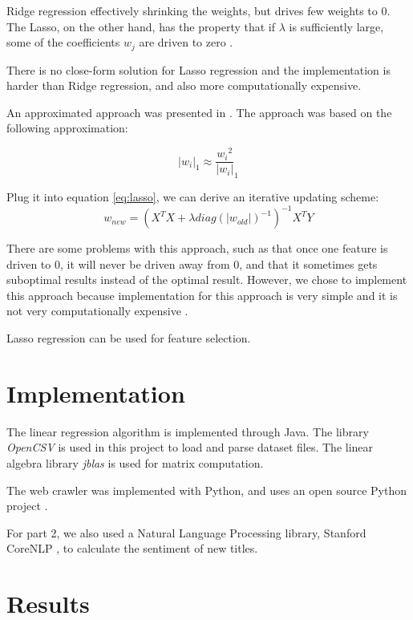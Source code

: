 \documentclass[conference,compsoc]{IEEEtran}
\begin{document}
Ridge regression effectively shrinking the weights, but drives few weights to 0. The Lasso, on the other hand, has the property that if $\lambda$ is sufficiently large, some of the coefficients $w_j$ are driven to zero \cite{bishop2006pattern}.

There is no close-form solution for Lasso regression and the implementation is harder than Ridge regression, and also more computationally expensive.

An approximated approach was presented in \cite{fan2001variable}. The approach was based on the following approximation:

\begin{equation}
	|w_i|_1 \approx \frac{{w_i}^2}{|w_i|}_1
\end{equation}

Plug it into equation \ref{eq:lasso}, we can derive an iterative updating scheme:
\begin{equation}
w_{new} = (X^T X + \lambda diag(|w_{old}|)^{-1} )^{-1} X^T Y
\end{equation}

There are some problems with this approach, such as that once one feature is driven to $0$, it will never be driven away from $0$, and that it sometimes gets suboptimal results instead of the optimal result. However, we chose to implement this approach because implementation for this approach is very simple and it is not very computationally expensive \cite{fan2001variable}.

Lasso regression can be used for feature selection.

\section{Implementation}

The linear regression algorithm is implemented through Java. The library \textit{OpenCSV} \cite{opencsv} is used in this project to load and parse dataset files. The linear algebra library \textit{jblas} \cite{jblas} is used for matrix computation.

The web crawler was implemented with Python, and uses an open source Python project \cite{invernizzi-2013-crawler}. 

For part 2, we also used a Natural Language Processing library, Stanford CoreNLP \cite{stanfordcorenlp}, to calculate the sentiment of new titles.

\section{Results}
\end{document}
